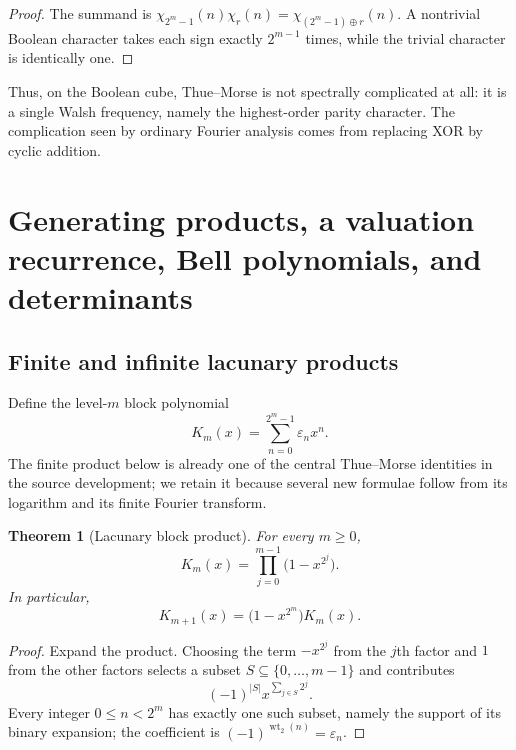 \documentclass[11pt,oneside]{article}
\newtheorem{theorem}{Theorem}[section]
\theoremstyle{definition}
\theoremstyle{remark}
\newcommand{\wt}{\operatorname{wt}_2}
\newcommand{\xor}{\mathbin{\oplus}}
\begin{document}
\begin{proof}
The summand is $\chi_{2^m-1}(n)\chi_r(n)
=\chi_{(2^m-1)\xor r}(n)$.  A nontrivial Boolean character takes each sign
exactly $2^{m-1}$ times, while the trivial character is identically one.
\end{proof}

Thus, on the Boolean cube, Thue--Morse is not spectrally complicated at all: it
is a single Walsh frequency, namely the highest-order parity character.  The
complication seen by ordinary Fourier analysis comes from replacing XOR by
cyclic addition.

\section{Generating products, a valuation recurrence, Bell polynomials, and determinants}
\label{sec:generating}

\subsection{Finite and infinite lacunary products}

Define the level-$m$ block polynomial
\begin{equation}
  K_m(x)=\sum_{n=0}^{2^m-1}\varepsilon_nx^n.                \label{eq:Km-definition}
\end{equation}
The finite product below is already one of the central Thue--Morse identities in
the source development; we retain it because several new formulae follow from
its logarithm and its finite Fourier transform.

\begin{theorem}[Lacunary block product]
\label{thm:lacunary-block-product}
For every $m\ge0$,
\begin{equation}
  \boxed{\displaystyle
  K_m(x)=\prod_{j=0}^{m-1}\bigl(1-x^{2^j}\bigr).}           \label{eq:Km-product}
\end{equation}
In particular,
\begin{equation}
  K_{m+1}(x)=\bigl(1-x^{2^m}\bigr)K_m(x).                  \label{eq:Km-recursion}
\end{equation}
\end{theorem}

\begin{proof}
Expand the product.  Choosing the term $-x^{2^j}$ from the $j$th factor and $1$
from the other factors selects a subset $S\subseteq\{0,\ldots,m-1\}$ and
contributes
\[
  (-1)^{|S|}x^{\sum_{j\in S}2^j}.
\]
Every integer $0\le n<2^m$ has exactly one such subset, namely the support of its
binary expansion; the coefficient is $(-1)^{\wt(n)}=\varepsilon_n$.
\end{proof}
\end{document}

